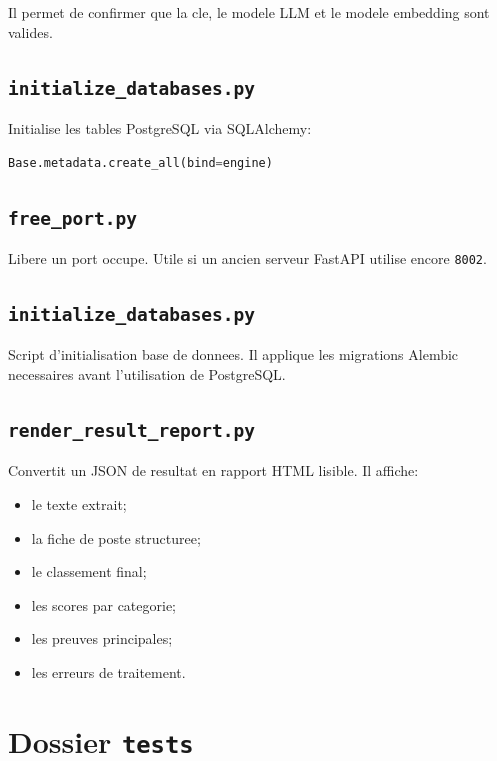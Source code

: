 \documentclass[12pt,a4paper]{article}
\begin{document}
Il permet de confirmer que la cle, le modele LLM et le modele embedding sont valides.

\subsection{\texttt{initialize\_databases.py}}

Initialise les tables PostgreSQL via SQLAlchemy:

\begin{lstlisting}[style=smartcode,language=Python]
Base.metadata.create_all(bind=engine)
\end{lstlisting}

\subsection{\texttt{free\_port.py}}

Libere un port occupe. Utile si un ancien serveur FastAPI utilise encore \texttt{8002}.

\subsection{\texttt{initialize\_databases.py}}

Script d'initialisation base de donnees. Il applique les migrations Alembic necessaires avant l'utilisation de PostgreSQL.

\subsection{\texttt{render\_result\_report.py}}

Convertit un JSON de resultat en rapport HTML lisible. Il affiche:

\begin{itemize}
  \item le texte extrait;
  \item la fiche de poste structuree;
  \item le classement final;
  \item les scores par categorie;
  \item les preuves principales;
  \item les erreurs de traitement.
\end{itemize}

\section{Dossier \texttt{tests}}
\end{document}
